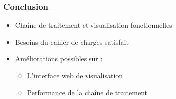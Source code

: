 \documentclass[10pt, compress]{beamer}
\begin{document}
\begin{frame}
\frametitle{Conclusion}
\begin{itemize}[<+->]
	[square]
	\item{Chaîne de traitement et visualisation fonctionnelles}
	\item{Besoins du cahier de charges satisfait}
	\item{Améliorations possibles sur :}
		\begin{itemize}[<+->]
			\item{L'interface web de visualisation}
			\item{Performance de la chaîne de traitement}
\end{itemize}
\end{itemize}
\end{frame}
\end{document}
